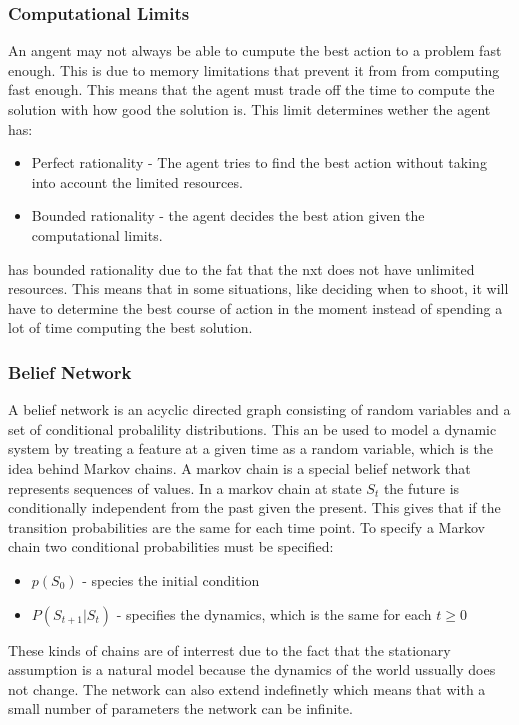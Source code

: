 \subsubsection{Computational Limits}
An angent may not always be able to cumpute the best action to a problem fast
enough. This is due to memory limitations that prevent it from from computing
fast enough. This means that the agent must trade off the time to compute the
solution with how good the solution is. This limit determines wether the agent
has:

\begin{itemize}
  \item Perfect rationality - The agent tries to find the best action without
  taking into account the limited resources.
  \item Bounded rationality - the agent decides the best ation given the
  computational limits.
\end{itemize}

\namep has bounded rationality due to the fat that the nxt does not have
unlimited resources. This means that in some situations, like deciding when
to shoot, it will have to determine the best course of action in the moment
instead of spending a lot of time computing the best solution. 

\subsubsection{Belief Network}
A belief network is an acyclic directed graph consisting of random variables and
a set of conditional probalility distributions. This an be used to model a
dynamic system by treating a feature at a given time as a random variable, which
is the idea behind Markov chains. A markov chain is a special belief network
that represents sequences of values.
In a markov chain at state $S_t$ the future is conditionally independent from
the past given the present. This gives that if the transition probabilities are
the same for each time point. To specify a Markov chain two conditional
probabilities must be specified:
\begin{itemize}
  \item $p(S_0)$ - species the initial condition
  \item $P(S_{t+1}|S_t)$ - specifies the dynamics, which is the same for each $t
  \geq 0$
\end{itemize}

These kinds of chains are of interrest due to the fact that the stationary
assumption is a natural model because the dynamics of the world ussually does
not change. The network can also extend indefinetly which means that with a
small number of parameters the network can be infinite.\nl

